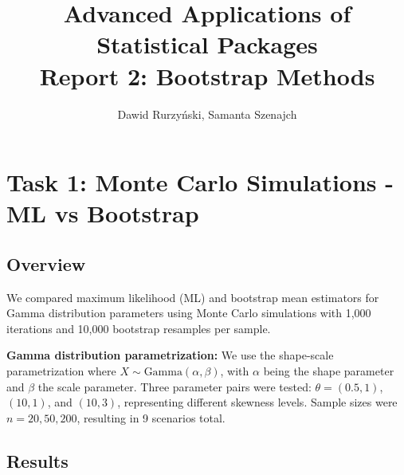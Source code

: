 \documentclass[12pt, a4paper]{article}\usepackage[]{graphicx}\usepackage[]{xcolor}
\begin{document}
\title{Advanced Applications of Statistical Packages\\Report 2: Bootstrap Methods}
\author{Dawid Rurzyński, Samanta Szenajch}
\maketitle

\tableofcontents
\newpage

\section{Task 1: Monte Carlo Simulations - ML vs Bootstrap}

\subsection{Overview}

We compared maximum likelihood (ML) and bootstrap mean estimators for Gamma distribution parameters using Monte Carlo simulations with 1,000 iterations and 10,000 bootstrap resamples per sample.

\textbf{Gamma distribution parametrization:} We use the shape-scale parametrization where $X \sim \text{Gamma}(\alpha, \beta)$, with $\alpha$ being the shape parameter and $\beta$ the scale parameter. Three parameter pairs were tested: $\theta=(0.5,1)$, $(10,1)$, and $(10,3)$, representing different skewness levels. Sample sizes were $n=20, 50, 200$, resulting in 9 scenarios total.

\subsection{Results}
\end{document}
